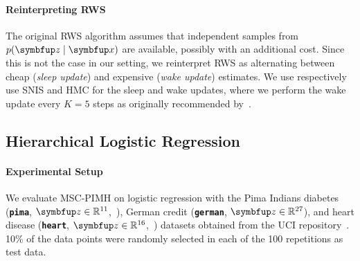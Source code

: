 \paragraph{Reinterpreting RWS}
The original RWS algorithm assumes that independent samples from \(p(\vz\mid\vx)\) are available, possibly with an additional cost.
Since this is not the case in our setting, we reinterpret RWS as alternating between cheap (\textit{sleep update}) and expensive (\textit{wake update}) estimates.
We use respectively use SNIS and HMC for the sleep and wake updates, where we perform the wake update every \(K=5\) steps as originally recommended by~\citet{DBLP:journals/corr/BornscheinB14}.


\subsection{Hierarchical Logistic Regression}\label{section:logistic}
\vspace{-0.05in}
\paragraph{Experimental Setup}
We evaluate MSC-PIMH on logistic regression with the Pima Indians diabetes (\textbf{\texttt{pima}}, \(\vz \in \mathbb{R}^{11}\),~\citealt{smith_using_1988}), German credit (\textbf{\texttt{german}}, \(\vz \in \mathbb{R}^{27}\)), and heart disease (\textbf{\texttt{heart}}, \(\vz \in \mathbb{R}^{16}\),~\citealt{detrano_international_1989}) datasets obtained from the UCI repository~\citep{Dua:2019}.
10\% of the data points were randomly selected in each of the 100 repetitions as test data.

